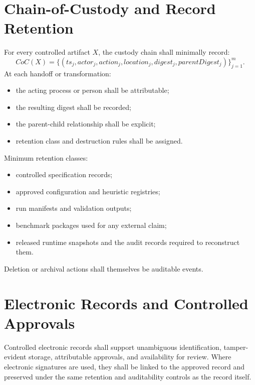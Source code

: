 \section{Chain-of-Custody and Record Retention}

For every controlled artifact $X$, the custody chain shall minimally record:
\[
CoC(X)=\{(ts_j, actor_j, action_j, location_j, digest_j, parentDigest_j)\}_{j=1}^{m}.
\]
At each handoff or transformation:
\begin{itemize}
\item the acting process or person shall be attributable;
\item the resulting digest shall be recorded;
\item the parent-child relationship shall be explicit;
\item retention class and destruction rules shall be assigned.
\end{itemize}

Minimum retention classes:
\begin{itemize}
\item controlled specification records;
\item approved configuration and heuristic registries;
\item run manifests and validation outputs;
\item benchmark packages used for any external claim;
\item released runtime snapshots and the audit records required to reconstruct them.
\end{itemize}

Deletion or archival actions shall themselves be auditable events.

\section{Electronic Records and Controlled Approvals}

Controlled electronic records shall support unambiguous identification, tamper-evident storage, attributable approvals, and availability for review. Where electronic signatures are used, they shall be linked to the approved record and preserved under the same retention and auditability controls as the record itself.
